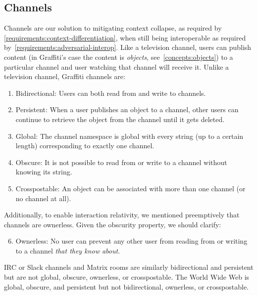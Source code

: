 \subsection{Channels}
\label{concepts:channels}

Channels are our solution to mitigating context collapse, as required by
\ref{requirements:context-differentiation}, when still being
interoperable as required by~\ref{requirements:adversarial-interop}.
Like a television channel, users can publish content (in Graffiti's case
the content is \emph{objects}, see~\ref{concepts:objects}) to a particular channel
and user watching that channel will receive it.
Unlike a television channel, Graffiti channels are:
\begin{enumerate}
\item
Bidirectional: Users can both read from and write to channels.
\item
Persistent: When a user publishes an object to a channel, other users can
continue to retrieve the object from the channel until it gets deleted.
\item
Global: The channel namespace is global with every string (up to a certain length)
corresponding to exactly one channel.
\item
Obscure: It is not possible to read from or write to a channel without knowing
its string.
\item
Crosspostable: An object can be associated with more than one channel (or no channel at all).
\end{enumerate}

Additionally, to enable interaction relativity, we mentioned preemptively that channels are ownerless.
Given the obscurity property, we should clarify:

\begin{enumerate}
\setcounter{enumi}{5}
\item
Ownerless: No user can prevent any other user from reading from or writing to a channel
\emph{that they know about}.
\end{enumerate}

IRC or Slack channels and Matrix rooms are similarly bidirectional and persistent
but are not global, obscure, ownerless, or crosspostable.
The World Wide Web is global, obscure, and persistent
but not bidirectional, ownerless, or crosspostable.


